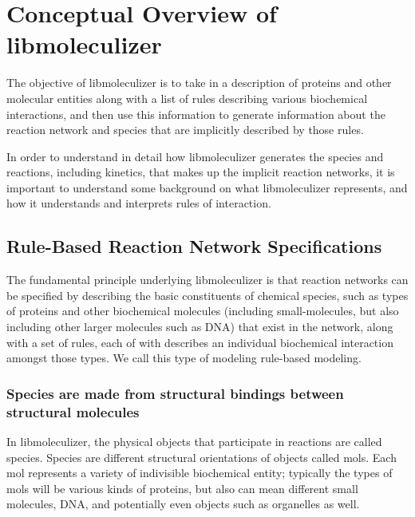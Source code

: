 \chapter{Conceptual Overview of libmoleculizer}

The objective of libmoleculizer is to take in a description of
proteins and other molecular entities along with a list of rules
describing various biochemical interactions, and then use this
information to generate information about the reaction network and
species that are implicitly described by those rules.

In order to understand in detail how libmoleculizer generates the
species and reactions, including kinetics, that makes up the implicit
reaction networks, it is important to understand some background
on what libmoleculizer represents, and how it understands and interprets
rules of interaction.


\section{Rule-Based Reaction Network Specifications}
\label{concRuleBasedSpec}

The fundamental principle underlying libmoleculizer is that reaction
networks can be specified by describing the basic constituents of
chemical species, such as types of proteins and other biochemical molecules
(including small-molecules, but also including other larger molecules
such as DNA) that exist in the network, along with a set of
rules, each of with describes an individual biochemical interaction
amongst those types.  We call this type of modeling rule-based
modeling.  


\subsection{Species are made from structural bindings between
  structural molecules}

In libmoleculizer, the physical objects that participate in reactions
are called species. Species are different structural orientations of
objects called mols. Each mol represents a variety of indivisible
biochemical entity; typically the types of mols will be various kinds
of proteins, but also can mean different small molecules, DNA, and
potentially even objects such as organelles as well.

